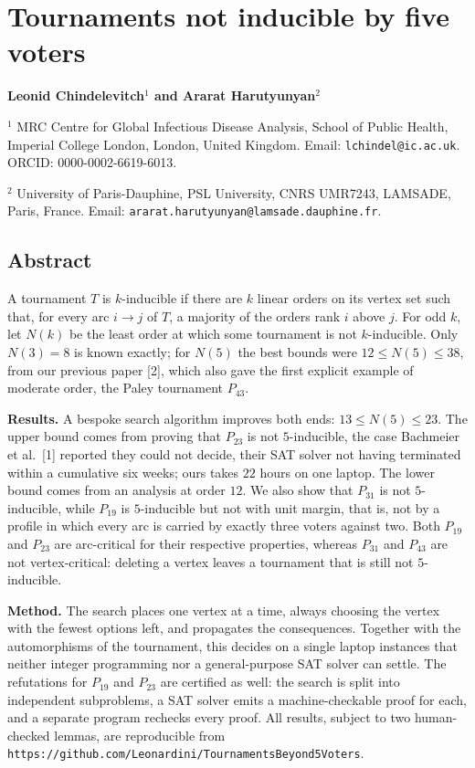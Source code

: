 \documentclass[
]{article}
\author{}
\date{\vspace{-2.5em}}
\begin{document}
\section{Tournaments not inducible by five
voters}\label{tournaments-not-inducible-by-five-voters}

\textbf{Leonid Chindelevitch\(^{1}\) and Ararat Harutyunyan\(^{2}\)}

\(^{1}\) MRC Centre for Global Infectious Disease Analysis, School of
Public Health, Imperial College London, London, United Kingdom. Email:
\texttt{lchindel@ic.ac.uk}. ORCID: 0000-0002-6619-6013.

\(^{2}\) University of Paris-Dauphine, PSL University, CNRS UMR7243,
LAMSADE, Paris, France. Email:
\texttt{ararat.harutyunyan@lamsade.dauphine.fr}.

\subsection{Abstract}\label{abstract}

A tournament \(T\) is \(k\)-inducible if there are \(k\) linear orders
on its vertex set such that, for every arc \(i \to j\) of \(T\), a
majority of the orders rank \(i\) above \(j\). For odd \(k\), let
\(N(k)\) be the least order at which some tournament is not
\(k\)-inducible. Only \(N(3) = 8\) is known exactly; for \(N(5)\) the
best bounds were \(12 \le N(5) \le 38\), from our previous paper
{[}2{]}, which also gave the first explicit example of moderate order,
the Paley tournament \(P_{43}\).

\textbf{Results.} A bespoke search algorithm improves both ends:
\(13 \le N(5) \le 23\). The upper bound comes from proving that
\(P_{23}\) is not \(5\)-inducible, the case Bachmeier et al.~{[}1{]}
reported they could not decide, their SAT solver not having terminated
within a cumulative six weeks; ours takes \(22\) hours on one laptop.
The lower bound comes from an analysis at order \(12\). We also show
that \(P_{31}\) is not \(5\)-inducible, while \(P_{19}\) is
\(5\)-inducible but not with unit margin, that is, not by a profile in
which every arc is carried by exactly three voters against two. Both
\(P_{19}\) and \(P_{23}\) are arc-critical for their respective
properties, whereas \(P_{31}\) and \(P_{43}\) are not vertex-critical:
deleting a vertex leaves a tournament that is still not \(5\)-inducible.

\textbf{Method.} The search places one vertex at a time, always choosing
the vertex with the fewest options left, and propagates the
consequences. Together with the automorphisms of the tournament, this
decides on a single laptop instances that neither integer programming
nor a general-purpose SAT solver can settle. The refutations for
\(P_{19}\) and \(P_{23}\) are certified as well: the search is split
into independent subproblems, a SAT solver emits a machine-checkable
proof for each, and a separate program rechecks every proof. All
results, subject to two human-checked lemmas, are reproducible from
\texttt{https://github.com/Leonardini/TournamentsBeyond5Voters}.
\end{document}
